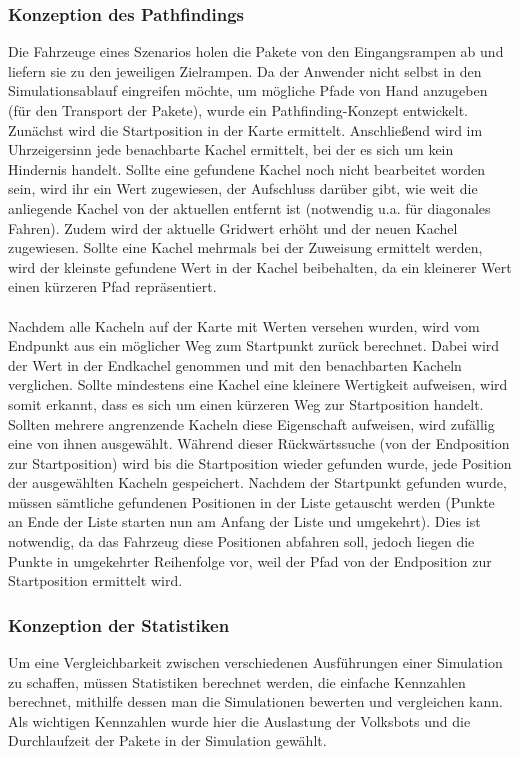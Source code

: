 \subsubsection{Konzeption des Pathfindings}
Die Fahrzeuge eines Szenarios holen die Pakete von den Eingangsrampen ab und liefern sie zu den jeweiligen Zielrampen. Da der Anwender nicht selbst in den Simulationsablauf eingreifen möchte, um mögliche Pfade von Hand anzugeben (für den Transport der Pakete), wurde ein Pathfinding-Konzept entwickelt. Zunächst wird die Startposition in der Karte ermittelt. Anschließend wird im Uhrzeigersinn jede benachbarte Kachel ermittelt, bei der es sich um kein Hindernis handelt. Sollte eine gefundene Kachel noch nicht bearbeitet worden sein, wird ihr ein Wert zugewiesen, der  Aufschluss darüber gibt, wie weit die anliegende Kachel von der aktuellen entfernt ist (notwendig u.a. für diagonales Fahren). Zudem wird der aktuelle Gridwert erhöht und der neuen Kachel zugewiesen. Sollte eine Kachel mehrmals bei der Zuweisung ermittelt werden, wird der kleinste gefundene Wert in der Kachel beibehalten, da ein kleinerer Wert einen kürzeren Pfad repräsentiert.
\\\\
Nachdem alle Kacheln auf der Karte mit Werten versehen wurden, wird vom Endpunkt aus ein möglicher Weg zum Startpunkt zurück berechnet. Dabei wird der Wert in der Endkachel genommen und mit den benachbarten Kacheln verglichen. Sollte mindestens eine Kachel eine kleinere Wertigkeit aufweisen, wird somit erkannt, dass es sich um einen kürzeren Weg zur Startposition handelt. Sollten mehrere angrenzende Kacheln diese Eigenschaft aufweisen, wird zufällig eine von ihnen ausgewählt. Während dieser Rückwärtssuche (von der Endposition zur Startposition)
wird bis die Startposition wieder gefunden wurde, jede Position der ausgewählten Kacheln gespeichert. Nachdem der Startpunkt gefunden wurde, müssen sämtliche gefundenen Positionen in der Liste getauscht werden (Punkte an Ende der Liste starten nun am Anfang der Liste und umgekehrt).
Dies ist notwendig, da das Fahrzeug diese Positionen abfahren soll, jedoch liegen die Punkte in umgekehrter Reihenfolge vor, weil der Pfad von der Endposition zur Startposition ermittelt wird.

\subsubsection{Konzeption der Statistiken}\label{konzept_statistik}
Um eine Vergleichbarkeit zwischen verschiedenen Ausführungen einer Simulation zu schaffen, müssen Statistiken berechnet werden, die einfache Kennzahlen berechnet, mithilfe dessen man die Simulationen bewerten und vergleichen kann. Als wichtigen Kennzahlen wurde hier die Auslastung der Volksbots und die Durchlaufzeit der Pakete in der Simulation gewählt.

